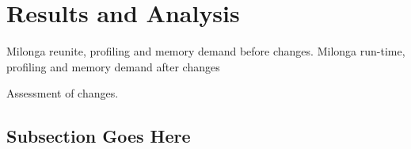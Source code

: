 \documentclass{anstrans}
\begin{document}
\section{Results and Analysis}

Milonga reunite, profiling and memory demand before changes.
Milonga run-time, profiling and memory demand after changes

Assessment of changes.

\subsection{Subsection Goes Here}


\end{document}
